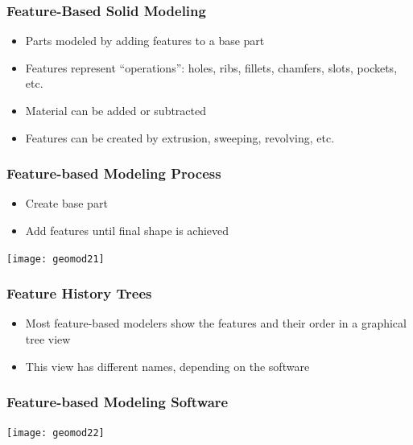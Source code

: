 \begin{frame}[fragile]\frametitle{Feature-Based Solid Modeling}

\begin{itemize}
\item Parts modeled by adding features to a base part
\item Features represent ``operations'': holes, ribs, fillets, chamfers, slots, pockets, etc.
\item Material can be added or subtracted
\item Features can be created by extrusion, sweeping, revolving, etc.
\end{itemize}

\end{frame}

\begin{frame}[fragile]\frametitle{Feature-based Modeling Process}

\begin{itemize}
\item Create base part
\item Add features until final shape is achieved
\end{itemize}

			\begin{center}
	\texttt{[image: geomod21]}
			\end{center}
\end{frame}

\begin{frame}[fragile]\frametitle{Feature History Trees}

\begin{itemize}
\item Most feature-based modelers show the features and their order in a graphical tree view
\item This view has different names, depending on the software
\end{itemize}
\end{frame}

\begin{frame}[fragile]\frametitle{Feature-based Modeling Software}

			\begin{center}
	\texttt{[image: geomod22]}
			\end{center}
\end{frame}

